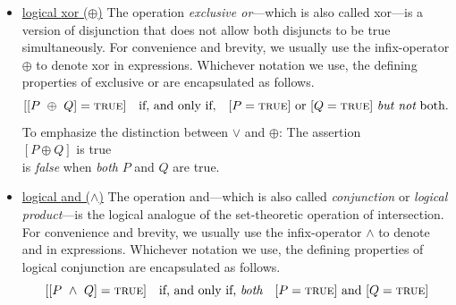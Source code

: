 \begin{itemize}
\item
\underline{logical {\small\sf xor} ($\oplus$)}
%
The operation {\em exclusive or}---which is also called {\small\sf
  xor}---is a version of disjunction that does not allow both
disjuncts to be true simultaneously.  For convenience and brevity, we
usually use the infix-operator $\oplus$ to denote {\small\sf xor} in
expressions.  Whichever notation we use, the defining properties of
exclusive or are encapsulated as follows. 
\[
[[P \ \oplus \ Q] =  \mbox{\sc true}] \ \ \mbox{ if, and only if, } \ \ 
[P = \mbox{\sc true}] \mbox{ or }
[Q = \mbox{\sc true}] \mbox{ {\em but not} both}.
\]
To emphasize the distinction between $\vee$ and $\oplus$: The
assertion \\
\hspace*{.35in}$[P \oplus Q]$ is \mbox{\sc true} \\
%
is {\em false} when {\em both} $P$ and $Q$ are true.

\item
\underline{logical {\small\sf and} ($\wedge$)}
%
The operation {\small\sf and}---which is also called {\em conjunction}
or {\em logical product}---is the logical analogue of the
set-theoretic operation of intersection.  For convenience and brevity,
we usually use the infix-operator $\wedge$ to denote {\small\sf and}
in expressions.  Whichever notation we use, the defining properties of
logical conjunction are encapsulated as follows.
\[ [[P \ \wedge \ Q] = \mbox{\sc true}]  \ \ \mbox{ if, and only if,
  {\em both} } \ \ 
 [P = \mbox{\sc true}] \mbox{ and } [Q = \mbox{\sc true}]
\]


\end{itemize}
